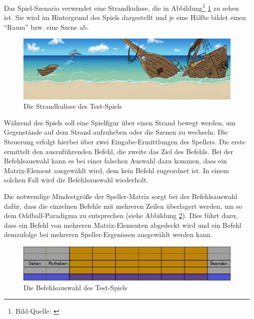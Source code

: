 Das Spiel-Szenario verwendet eine Strandkulisse, die in Abbildung\footnote[1]{Bild-Quelle: \cite{JM2014}} \ref{strand1} zu sehen ist.
Sie wird im Hintergrund des Spiels dargestellt und je eine Hälfte bildet einen "`Raum"' bzw. eine Szene ab.\\

\begin{figure}[ht]
\centering
\includegraphics[scale=0.88]{images/MI_beach.png}
\caption{Die Strandkulisse des Test-Spiels}
\label{strand1}
\end{figure}

Während des Spiels soll eine Spielfigur über einen Strand bewegt werden, um Gegenstände auf dem Strand aufzuheben oder die Szenen zu wechseln.
Die Steuerung erfolgt hierbei über zwei Eingabe-Ermittlungen des Spellers.
Die erste ermittelt den auszuführenden Befehl, die zweite das Ziel des Befehls.
Bei der Befehlsauswahl kann es bei einer falschen Auswahl dazu kommen, dass ein Matrix-Element ausgewählt wird, dem kein Befehl zugeordnet ist. 
In einem solchen Fall wird die Befehlsauswahl wiederholt.\\

\pagebreak

Die notwendige Mindestgröße der Speller-Matrix sorgt bei der Befehlsauswahl dafür, 
dass die einzelnen Befehle mit mehreren Zeilen überlagert werden, 
um so dem Oddball-Paradigma zu entsprechen (siehe Abbildung \ref{Befehlsauswahl}).
Dies führt dazu, dass ein Befehl von mehreren Matrix-Elementen abgedeckt wird und ein Befehl demzufolge bei mehreren Speller-Ergenissen ausgewählt werden kann.\\

\begin{figure}[ht]
\centering
\includegraphics[scale=0.5]{images/Befehlsauswahl.png}
\caption{Die Befehlsauswahl des Test-Spiels}
\label{Befehlsauswahl}
\end{figure}

